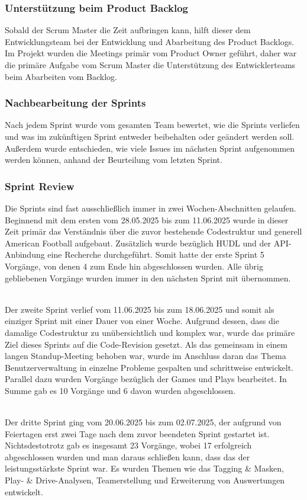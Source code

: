\subsubsection{Unterstützung beim Product Backlog}
Sobald der Scrum Master die Zeit aufbringen kann, hilft dieser dem Entwicklungsteam bei der Entwicklung und Abarbeitung des Product Backlogs. Im Projekt wurden die Meetings primär vom Product Owner geführt, daher war die primäre Aufgabe vom Scrum Master die Unterstützung des Entwicklerteams beim Abarbeiten vom Backlog.
\newpage
\subsubsection{Nachbearbeitung der Sprints}
Nach jedem Sprint wurde vom gesamten Team bewertet, wie die Sprints verliefen und was im zukünftigen Sprint entweder beibehalten oder geändert werden soll. Außerdem wurde entschieden, wie viele Issues im nächsten Sprint aufgenommen werden können, anhand der Beurteilung vom letzten Sprint. 

\subsubsection{Sprint Review}
Die Sprints sind fast ausschließlich immer in zwei Wochen-Abschnitten gelaufen. Beginnend mit dem ersten vom 28.05.2025 bis zum 11.06.2025 wurde in dieser Zeit primär das Verständnis über die zuvor bestehende Codestruktur und generell American Football aufgebaut. Zusätzlich wurde bezüglich HUDL und der API-Anbindung eine Recherche durchgeführt. Somit hatte der erste Sprint 5 Vorgänge, von denen 4 zum Ende hin abgeschlossen wurden. Alle übrig gebliebenen Vorgänge wurden immer in den nächsten Sprint mit übernommen. 

\noindent
\\
Der zweite Sprint verlief vom 11.06.2025 bis zum 18.06.2025 und somit als einziger Sprint mit einer Dauer von einer Woche. Aufgrund dessen, dass die damalige Codestruktur zu unübersichtlich und komplex war, wurde das primäre Ziel dieses Sprints auf die Code-Revision gesetzt. Als das gemeinsam in einem langen Standup-Meeting behoben war, wurde im Anschluss daran das Thema Benutzerverwaltung in einzelne Probleme gespalten und schrittweise entwickelt. Parallel dazu wurden Vorgänge bezüglich der Games und Plays bearbeitet. In Summe gab es 10 Vorgänge und 6 davon wurden abgeschlossen.

\noindent
\\
Der dritte Sprint ging vom 20.06.2025 bis zum 02.07.2025, der aufgrund von Feiertagen erst zwei Tage nach dem zuvor beendeten Sprint gestartet ist. Nichtsdestotrotz gab es insgesamt 23 Vorgänge, wobei 17 erfolgreich abgeschlossen wurden und man daraus schließen kann, dass das der leistungsstärkste Sprint war. Es wurden Themen wie das Tagging \& Masken, Play- \& Drive-Analysen, Teamerstellung und Erweiterung von Auswertungen entwickelt.

